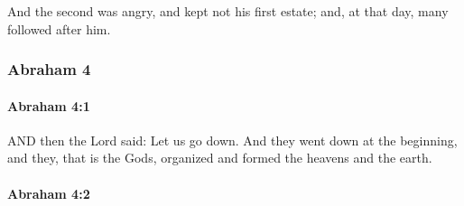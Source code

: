 			And the second was angry, and kept not his first estate; and, at that day, many followed after him.

		
	\subsubsection{Abraham 4} %
		\label{ABRAHAM-4}
		
		\paragraph{Abraham 4:1} %
			\label{ABRAHAM-4-1}

			AND then the Lord said: Let us go down.  And they went down at the beginning, and they, that is the Gods, organized and formed the heavens and the earth.


		\paragraph{Abraham 4:2} %
			\label{ABRAHAM-4-2}

